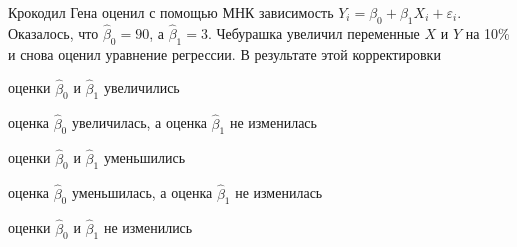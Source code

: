 
\begin{question}
Крокодил Гена оценил с помощью МНК зависимость
\(Y_i = \beta_0 + \beta_1 X_i + \varepsilon_i\). Оказалось, что
\(\hat \beta_0 = 90\), а \(\hat\beta_1 = 3\). Чебурашка увеличил
переменные \(X\) и \(Y\) на 10\% и снова оценил уравнение регрессии. В
результате этой корректировки
\begin{answerlist}
  \item оценки \(\hat\beta_0\) и \(\hat\beta_1\) увеличились
  \item оценка \(\hat\beta_0\) увеличилась, а оценка \(\hat\beta_1\) не
изменилась
  \item оценки \(\hat\beta_0\) и \(\hat\beta_1\) уменьшились
  \item оценка \(\hat\beta_0\) уменьшилась, а оценка \(\hat\beta_1\) не
изменилась
  \item оценки \(\hat\beta_0\) и \(\hat\beta_1\) не изменились
\end{answerlist}
\end{question}


